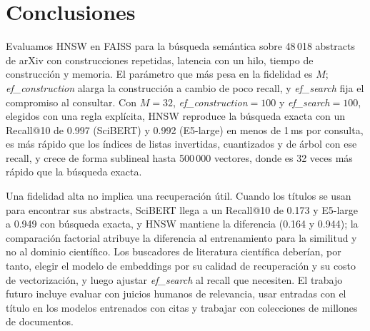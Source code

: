 \documentclass[runningheads]{llncs}
\newcommand{\efc}{\textit{ef\_construction}}
\newcommand{\efs}{\textit{ef\_search}}
\begin{document}
\section{Conclusiones}

Evaluamos HNSW en FAISS para la búsqueda semántica sobre 48\,018 abstracts de arXiv con
construcciones repetidas, latencia con un hilo, tiempo de construcción y memoria. El
parámetro que más pesa en la fidelidad es $M$; \efc{} alarga la construcción a cambio de poco
recall, y \efs{} fija el compromiso al consultar. Con $M=32$, \efc{}$=100$ y \efs{}$=100$,
elegidos con una regla explícita, HNSW reproduce la búsqueda exacta con un Recall@10 de 0.997
(SciBERT) y 0.992 (E5-large) en menos de 1\,ms por consulta, es más rápido que los índices de
listas invertidas, cuantizados y de árbol con ese recall, y crece de forma sublineal hasta
500\,000 vectores, donde es 32 veces más rápido que la búsqueda exacta.

Una fidelidad alta no implica una recuperación útil. Cuando los títulos se usan para encontrar
sus abstracts, SciBERT llega a un Recall@10 de 0.173 y E5-large a 0.949 con búsqueda exacta, y
HNSW mantiene la diferencia (0.164 y 0.944); la
comparación factorial atribuye la diferencia al entrenamiento para la similitud y no al
dominio científico. Los buscadores de literatura científica deberían, por tanto, elegir el
modelo de embeddings por su calidad de recuperación y su costo de vectorización, y luego
ajustar \efs{} al recall que necesiten. El trabajo futuro incluye evaluar con juicios humanos
de relevancia, usar entradas con el título en los modelos entrenados con citas y trabajar con
colecciones de millones de documentos.

\end{document}
